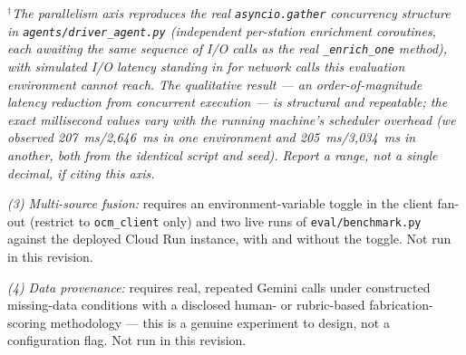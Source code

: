 \documentclass[preprint,12pt,authoryear]{elsarticle}
\begin{document}
\begin{table}[htbp]
\centering
\caption{Component ablation: axes 1--2 are independently reproducible today via \texttt{eval/ablation\_study.py}; axes 3--4 require live-deployment and LLM-in-the-loop experiments not yet run (see notes below).}
\label{tab:ablation}
\end{table}

\noindent$^\dagger$\textit{The parallelism axis reproduces the real \texttt{asyncio.gather} concurrency structure in \texttt{agents/driver\_agent.py} (independent per-station enrichment coroutines, each awaiting the same sequence of I/O calls as the real \texttt{\_enrich\_one} method), with simulated I/O latency standing in for network calls this evaluation environment cannot reach. The qualitative result --- an order-of-magnitude latency reduction from concurrent execution --- is structural and repeatable; the exact millisecond values vary with the running machine's scheduler overhead (we observed 207~ms/2{,}646~ms in one environment and 205~ms/3{,}034~ms in another, both from the identical script and seed). Report a range, not a single decimal, if citing this axis.}

\textit{(3) Multi-source fusion:} requires an environment-variable toggle in the client fan-out (restrict to \texttt{ocm\_client} only) and two live runs of \texttt{eval/benchmark.py} against the deployed Cloud Run instance, with and without the toggle. Not run in this revision.

\textit{(4) Data provenance:} requires real, repeated Gemini calls under constructed missing-data conditions with a disclosed human- or rubric-based fabrication-scoring methodology --- this is a genuine experiment to design, not a configuration flag. Not run in this revision.
\end{document}
